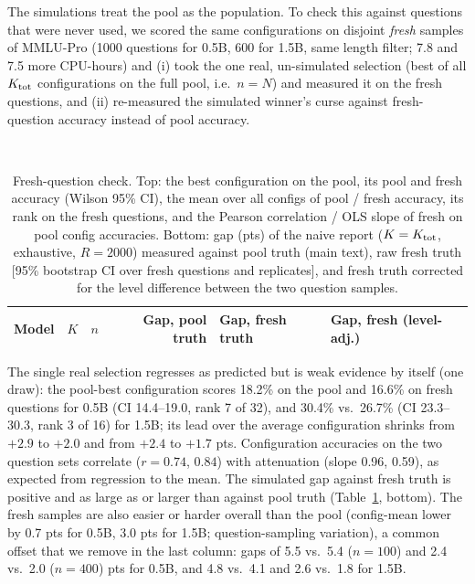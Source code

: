 The simulations treat the pool as the population. To check this against questions that were never used, we scored the same configurations on disjoint \emph{fresh} samples of MMLU-Pro (1000 questions for 0.5B, 600 for 1.5B, same length filter; 7.8 and 7.5 more CPU-hours) and (i) took the one real, un-simulated selection (best of all $K_{\rm tot}$ configurations on the full pool, i.e.\ $n=N$) and measured it on the fresh questions, and (ii) re-measured the simulated winner's curse against fresh-question accuracy instead of pool accuracy.
\begin{table}[t]
\caption{Fresh-question check. Top: the best configuration on the pool, its pool and fresh accuracy (Wilson 95\% CI), the mean over all configs of pool / fresh accuracy, its rank on the fresh questions, and the Pearson correlation / OLS slope of fresh on pool config accuracies. Bottom: gap (pts) of the naive report ($K=K_{\rm tot}$, exhaustive, $R{=}2000$) measured against pool truth (main text), raw fresh truth [95\% bootstrap CI over fresh questions and replicates], and fresh truth corrected for the level difference between the two question samples.}\label{tab:fresh}
\centering\footnotesize\setlength{\tabcolsep}{3pt}
\\[3pt]
\begin{tabular}{lrrrll}
\toprule Model & $K$ & $n$ & Gap, pool truth & Gap, fresh truth & Gap, fresh (level-adj.)\\ \midrule
\end{tabular}
\end{table}
The single real selection regresses as predicted but is weak evidence by itself (one draw): the pool-best configuration scores 18.2\% on the pool and 16.6\% on fresh questions for 0.5B (CI 14.4--19.0, rank 7 of 32), and 30.4\% vs.\ 26.7\% (CI 23.3--30.3, rank 3 of 16) for 1.5B; its lead over the average configuration shrinks from $+2.9$ to $+2.0$ and from $+2.4$ to $+1.7$ pts. Configuration accuracies on the two question sets correlate ($r=0.74$, $0.84$) with attenuation (slope 0.96, 0.59), as expected from regression to the mean.
The simulated gap against fresh truth is positive and as large as or larger than against pool truth (Table~\ref{tab:fresh}, bottom). The fresh samples are also easier or harder overall than the pool (config-mean lower by 0.7 pts for 0.5B, 3.0 pts for 1.5B; question-sampling variation), a common offset that we remove in the last column: gaps of 5.5 vs.\ 5.4 ($n{=}100$) and 2.4 vs.\ 2.0 ($n{=}400$) pts for 0.5B, and 4.8 vs.\ 4.1 and 2.6 vs.\ 1.8 for 1.5B.
